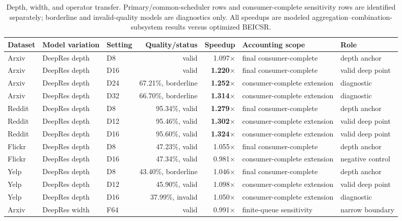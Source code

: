 \documentclass[10pt,conference]{IEEEtran}
\newcommand{\beicsr}{\textsc{BEICSR}}
\begin{document}
\begin{table}[t]
\centering
\caption{Depth, width, and operator transfer. Primary/common-scheduler rows and consumer-complete sensitivity rows are identified separately; borderline and invalid-quality models are diagnostics only. All speedups are modeled aggregation--combination-subsystem results versus optimized \beicsr{}.}
\label{tab:s-transfer}
\scriptsize
\setlength{\tabcolsep}{4pt}
\begin{tabular}{lllrrll}
\toprule
Dataset & Model variation & Setting & Quality/status & Speedup & Accounting scope & Role \\
\midrule
Arxiv & DeepRes depth & D8  & valid & 1.097$\times$ & final consumer-complete & depth anchor \\
Arxiv & DeepRes depth & D16 & valid & \textbf{1.220$\times$} & final consumer-complete & valid deep point \\
Arxiv & DeepRes depth & D24 & 67.21\%, borderline & \textbf{1.252$\times$} & consumer-complete extension & diagnostic \\
Arxiv & DeepRes depth & D32 & 66.70\%, borderline & \textbf{1.314$\times$} & consumer-complete extension & diagnostic \\
Reddit & DeepRes depth & D8  & 95.34\%, valid & \textbf{1.279$\times$} & final consumer-complete & depth anchor \\
Reddit & DeepRes depth & D12 & 95.46\%, valid & \textbf{1.302$\times$} & consumer-complete extension & valid deep point \\
Reddit & DeepRes depth & D16 & 95.60\%, valid & \textbf{1.324$\times$} & consumer-complete extension & valid deep point \\
Flickr & DeepRes depth & D8  & 47.23\%, valid & 1.055$\times$ & final consumer-complete & depth anchor \\
Flickr & DeepRes depth & D16 & 47.34\%, valid & 0.981$\times$ & consumer-complete extension & negative control \\
Yelp & DeepRes depth & D8  & 43.40\%, borderline & 1.046$\times$ & final consumer-complete & depth anchor \\
Yelp & DeepRes depth & D12 & 45.90\%, valid & 1.098$\times$ & consumer-complete extension & valid deep point \\
Yelp & DeepRes depth & D16 & 37.99\%, invalid & 1.050$\times$ & consumer-complete extension & diagnostic \\
\midrule
Arxiv & DeepRes width & F64  & valid & 0.991$\times$ & finite-queue sensitivity & narrow boundary \\

\end{tabular}
\end{table}
\end{document}
